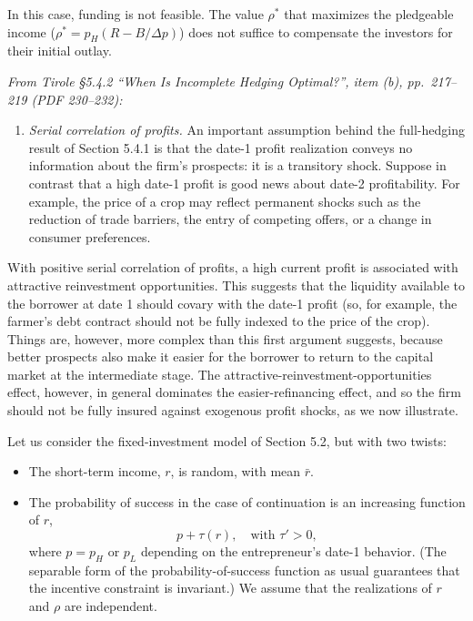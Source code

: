 \documentclass[11pt,a4paper]{article}
\providecommand{\tightlist}{\setlength{\itemsep}{0pt}\setlength{\parskip}{0pt}}
\begin{document}
In this case, funding is not feasible. The value \(\rho^*\) that maximizes the pledgeable income
(\(\rho^* = p_H(R - B/\Delta p)\)) does not suffice to compensate the investors for their initial
outlay.

\emph{From Tirole §5.4.2 ``When Is Incomplete Hedging Optimal?'', item (b), pp.~217--219 (PDF
230--232):}

\begin{enumerate}
\def\labelenumi{(\alph{enumi})}
\setcounter{enumi}{1}
\tightlist
\item
  \emph{Serial correlation of profits.} An important assumption behind the full-hedging result of
  Section 5.4.1 is that the date-1 profit realization conveys no information about the firm's
  prospects: it is a transitory shock. Suppose in contrast that a high date-1 profit is good news
  about date-2 profitability. For example, the price of a crop may reflect permanent shocks such as
  the reduction of trade barriers, the entry of competing offers, or a change in consumer
  preferences.
\end{enumerate}

With positive serial correlation of profits, a high current profit is associated with attractive
reinvestment opportunities. This suggests that the liquidity available to the borrower at date 1
should covary with the date-1 profit (so, for example, the farmer's debt contract should not be
fully indexed to the price of the crop). Things are, however, more complex than this first argument
suggests, because better prospects also make it easier for the borrower to return to the capital
market at the intermediate stage. The attractive-reinvestment-opportunities effect, however, in
general dominates the easier-refinancing effect, and so the firm should not be fully insured against
exogenous profit shocks, as we now illustrate.

Let us consider the fixed-investment model of Section 5.2, but with two twists:

\begin{itemize}
\tightlist
\item
  The short-term income, \(r\), is random, with mean \(\bar r\).
\item
  The probability of success in the case of continuation is an increasing function of \(r\),
  \[p + \tau(r), \quad \text{with } \tau' > 0,\] where \(p = p_H\) or \(p_L\) depending on the
  entrepreneur's date-1 behavior. (The separable form of the probability-of-success function as
  usual guarantees that the incentive constraint is invariant.) We assume that the realizations of
  \(r\) and \(\rho\) are independent.
\end{itemize}
\end{document}
